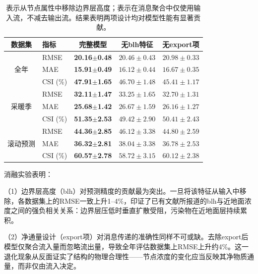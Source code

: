 \begin{table}[htbp]
    \centering
    \caption{\ModelPred{}消融实验结果}
    \caption*{表示从节点属性中移除边界层高度；表示在消息聚合中仅使用输入流，不减去输出流。结果表明两项设计均对模型性能有显著贡献。}
    \label{tab:pm25gnn_ablation_study}
    \begin{tabular}{@{}clccc@{}}
        \toprule
        \textbf{数据集} & \textbf{指标} & \textbf{完整模型} & \textbf{无blh特征} & \textbf{无export项} \\
        \midrule
        \multirow{3}{*}{全年} & RMSE & \textbf{20.16}$\pm$\textbf{0.48} & $20.46\pm0.43$ & $20.98\pm0.33$ \\
        & MAE & \textbf{15.91}$\pm$\textbf{0.49} & $16.12\pm0.44$ & $16.67\pm0.35$ \\
        & CSI (\%) & \textbf{47.91}$\pm$\textbf{1.65} & $46.70\pm1.48$ & $45.41\pm1.17$ \\
        \midrule
        \multirow{3}{*}{采暖季} & RMSE & \textbf{32.11}$\pm$\textbf{1.47} & $33.25\pm1.65$ & $32.70\pm1.31$ \\
        & MAE & \textbf{25.68}$\pm$\textbf{1.42} & $26.67\pm1.59$ & $26.16\pm1.27$ \\
        & CSI (\%) & \textbf{51.35}$\pm$\textbf{2.53} & $49.42\pm2.90$ & $50.41\pm2.43$ \\
        \midrule
        \multirow{3}{*}{滚动预测} & RMSE & \textbf{44.36}$\pm$\textbf{2.85} & $46.12\pm3.38$ & $44.80\pm2.59$ \\
        & MAE & \textbf{36.32}$\pm$\textbf{2.81} & $38.04\pm3.38$ & $36.78\pm2.53$ \\
        & CSI (\%) & \textbf{60.57}$\pm$\textbf{2.78} & $58.72\pm3.15$ & $60.12\pm2.38$ \\
        \bottomrule
    \end{tabular}
\end{table}

消融实验表明：

（1）边界层高度（blh）对预测精度的贡献最为突出。一旦将该特征从输入中移除，各数据集上的RMSE一致上升1--4\%，印证了已有文献所报道的blh与近地面\PM 浓度之间的强负相关关系\citep{su2018relationships,luan2018quantifying}：边界层压低时垂直扩散受阻，污染物在近地面层持续累积。

（2）净通量设计（export项）对消息传递的准确性同样不可或缺。去除export后模型仅聚合流入量而忽略流出量，导致全年评估数据集上RMSE上升约4\%。这一退化现象从反面证实了结构的物理合理性——节点浓度的变化应当反映其净物质通量，而非仅由流入决定。


